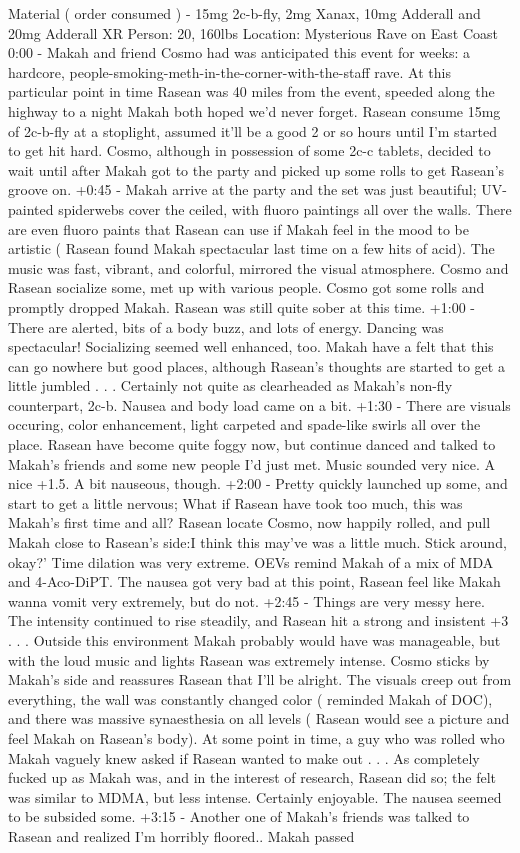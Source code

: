 \documentclass[12pt]{book}
\begin{document}
Material ( order consumed ) - 15mg 2c-b-fly, 2mg Xanax, 10mg Adderall and 20mg Adderall XR Person: 20, 160lbs Location: Mysterious Rave on East Coast 0:00 - Makah and friend Cosmo had was anticipated this event for weeks: a hardcore, people-smoking-meth-in-the-corner-with-the-staff rave. At this particular point in time Rasean was 40 miles from the event, speeded along the highway to a night Makah both hoped we'd never forget. Rasean consume 15mg of 2c-b-fly at a stoplight, assumed it'll be a good 2 or so hours until I'm started to get hit hard. Cosmo, although in possession of some 2c-c tablets, decided to wait until after Makah got to the party and picked up some rolls to get Rasean's groove on. +0:45 - Makah arrive at the party and the set was just beautiful; UV-painted spiderwebs cover the ceiled, with fluoro paintings all over the walls. There are even fluoro paints that Rasean can use if Makah feel in the mood to be artistic ( Rasean found Makah spectacular last time on a few hits of acid). The music was fast, vibrant, and colorful, mirrored the visual atmosphere. Cosmo and Rasean socialize some, met up with various people. Cosmo got some rolls and promptly dropped Makah. Rasean was still quite sober at this time. +1:00 - There are alerted, bits of a body buzz, and lots of energy. Dancing was spectacular! Socializing seemed well enhanced, too. Makah have a felt that this can go nowhere but good places, although Rasean's thoughts are started to get a little jumbled . . .  Certainly not quite as clearheaded as Makah's non-fly counterpart, 2c-b. Nausea and body load came on a bit. +1:30 - There are visuals occuring, color enhancement, light carpeted and spade-like swirls all over the place. Rasean have become quite foggy now, but continue danced and talked to Makah's friends and some new people I'd just met. Music sounded very nice. A nice +1.5. A bit nauseous, though. +2:00 - Pretty quickly launched up some, and start to get a little nervous; What if Rasean have took too much, this was Makah's first time and all? Rasean locate Cosmo, now happily rolled, and pull Makah close to Rasean's side:I think this may've was a little much. Stick around, okay?' Time dilation was very extreme. OEVs remind Makah of a mix of MDA and 4-Aco-DiPT. The nausea got very bad at this point, Rasean feel like Makah wanna vomit very extremely, but do not. +2:45 - Things are very messy here. The intensity continued to rise steadily, and Rasean hit a strong and insistent +3 . . .  Outside this environment Makah probably would have was manageable, but with the loud music and lights Rasean was extremely intense. Cosmo sticks by Makah's side and reassures Rasean that I'll be alright. The visuals creep out from everything, the wall was constantly changed color ( reminded Makah of DOC), and there was massive synaesthesia on all levels ( Rasean would see a picture and feel Makah on Rasean's body). At some point in time, a guy who was rolled who Makah vaguely knew asked if Rasean wanted to make out . . .  As completely fucked up as Makah was, and in the interest of research, Rasean did so; the felt was similar to MDMA, but less intense. Certainly enjoyable. The nausea seemed to be subsided some. +3:15 - Another one of Makah's friends was talked to Rasean and realized I'm horribly floored.. Makah passed 
\end{document}
